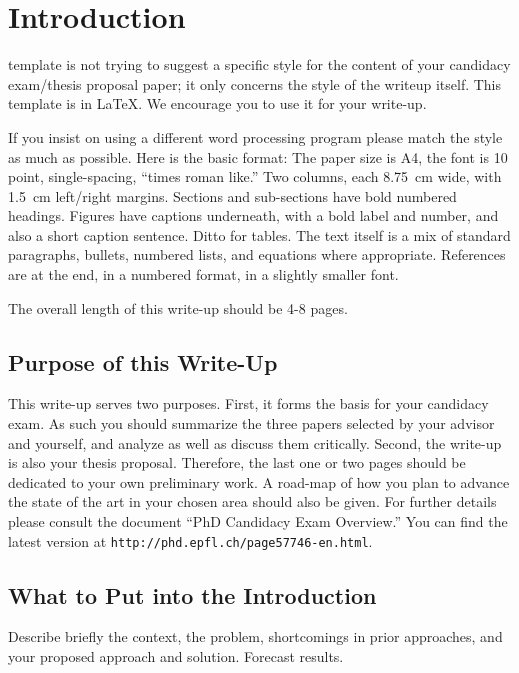 \section{Introduction}

 template is not trying to suggest a specific
style for the content of your candidacy exam/thesis proposal paper; it
only concerns the style of the writeup itself.  This template is in LaTeX.
We encourage you to use it for your write-up.

If you insist on using a different word processing program please
match the style as much as possible.  Here is the basic format: The
paper size is A4, the font is 10 point, 
single-spacing, ``times roman like.''
Two columns, each 8.75~cm wide, with 1.5~cm left/right margins.
Sections and sub-sections have bold numbered headings.  Figures have
captions underneath, with a bold label and number, and also a short
caption sentence.  Ditto for tables.  The text itself is a mix of standard
paragraphs, bullets, numbered lists, and equations where appropriate.
References are at the end, in a numbered format, in a slightly smaller
font.

The overall length of this write-up should be 4-8 pages. 

\subsection{Purpose of this Write-Up}

This write-up serves two purposes. First, it forms the basis for
your candidacy exam. As such you should summarize the three papers selected
by your advisor and yourself, and analyze as well as discuss them critically.
Second, the write-up 
is also your thesis proposal.  Therefore, the last one or two pages should
be dedicated to your own preliminary work. A road-map of how you plan to
advance the state of the art in your chosen area should also be given.
For further details please consult the document ``PhD Candidacy Exam Overview.'' You can find the latest
version at {\tt http://phd.epfl.ch/page57746-en.html}.


\subsection{What to Put into the Introduction}
Describe briefly the context, the problem, shortcomings in prior
approaches, and your proposed approach and solution. Forecast results.

